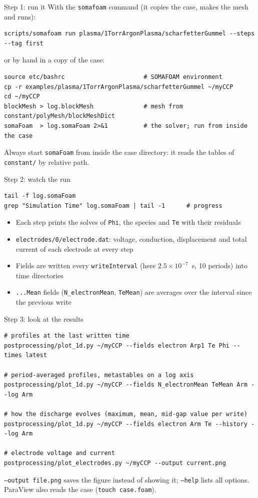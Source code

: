 \documentclass[aspectratio=169,11pt]{beamer}
\newcommand{\kw}[1]{\texttt{#1}}
\begin{document}
\begin{frame}[fragile]{Step 1: run it}
  With the \kw{somafoam} command (it copies the case, makes the mesh and runs):
  \begin{lstlisting}
scripts/somafoam run plasma/1TorrArgonPlasma/scharfetterGummel --steps --tag first
  \end{lstlisting}
  or by hand in a copy of the case:
  \begin{lstlisting}
source etc/bashrc                      # SOMAFOAM environment
cp -r examples/plasma/1TorrArgonPlasma/scharfetterGummel ~/myCCP
cd ~/myCCP
blockMesh > log.blockMesh              # mesh from constant/polyMesh/blockMeshDict
somaFoam  > log.somaFoam 2>&1          # the solver; run from inside the case
  \end{lstlisting}
  \small Always start \kw{somaFoam} from inside the case directory: it reads the tables
  of \kw{constant/} by relative path.
\end{frame}

\begin{frame}[fragile]{Step 2: watch the run}
  \begin{lstlisting}
tail -f log.somaFoam
grep "Simulation Time" log.somaFoam | tail -1      # progress
  \end{lstlisting}
  \begin{itemize}
    \item Each step prints the solves of \kw{Phi}, the species and \kw{Te} with their residuals
    \item \kw{electrodes/0/electrode.dat}: voltage, conduction, displacement and total
          current of each electrode at every step
    \item Fields are written every \kw{writeInterval} (here $2.5\times10^{-7}$~s, 10 periods)
          into time directories
    \item \kw{...Mean} fields (\kw{N\_electronMean}, \kw{TeMean}) are averages over the
          interval since the previous write
  \end{itemize}
\end{frame}

\begin{frame}[fragile]{Step 3: look at the results}
  \begin{lstlisting}
# profiles at the last written time
postprocessing/plot_1d.py ~/myCCP --fields electron Arp1 Te Phi --times latest

# period-averaged profiles, metastables on a log axis
postprocessing/plot_1d.py ~/myCCP --fields N_electronMean TeMean Arm --log Arm

# how the discharge evolves (maximum, mean, mid-gap value per write)
postprocessing/plot_1d.py ~/myCCP --fields electron Arm Te --history --log Arm

# electrode voltage and current
postprocessing/plot_electrodes.py ~/myCCP --output current.png
  \end{lstlisting}
  \small \kw{--output file.png} saves the figure instead of showing it; \kw{--help} lists
  all options. ParaView also reads the case (\kw{touch case.foam}).
\end{frame}
\end{document}
